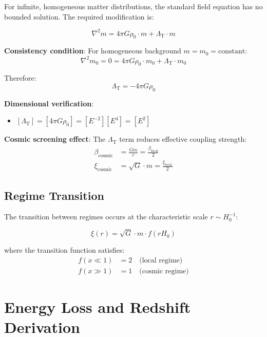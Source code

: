 \documentclass[12pt,a4paper]{article}
\newcommand{\LambdaT}{\Lambda_{\text{T}}}
\begin{document}
	For infinite, homogeneous matter distributions, the standard field equation has no bounded solution. The required modification is:
	
	\begin{equation}
		\boxed{\nabla^2 m = 4\pi G \rho_0 \cdot m + \LambdaT \cdot m}
	\end{equation}
	
	\textbf{Consistency condition}: For homogeneous background $m = m_0 = \text{constant}$:
	\begin{equation}
		\nabla^2 m_0 = 0 = 4\pi G \rho_0 \cdot m_0 + \LambdaT \cdot m_0
	\end{equation}
	
	Therefore:
	\begin{equation}
		\boxed{\LambdaT = -4\pi G \rho_0}
	\end{equation}
	
	\textbf{Dimensional verification}:
	\begin{itemize}
		\item $[\LambdaT] = [4\pi G \rho_0] = [E^{-2}][E^4] = [E^2]$ \checkmark
	\end{itemize}
	
	\textbf{Cosmic screening effect}: The $\LambdaT$ term reduces effective coupling strength:
	\begin{align}
		\beta_{\text{cosmic}} &= \frac{Gm}{r} = \frac{\beta_{\text{local}}}{2} \\
		\xi_{\text{cosmic}} &= \sqrt{G} \cdot m = \frac{\xi_{\text{local}}}{2}
	\end{align}
	
	\subsection{Regime Transition}
	\label{subsec:regime_transition}
	
	The transition between regimes occurs at the characteristic scale $r \sim H_0^{-1}$:
	
	\begin{equation}
		\xi(r) = \sqrt{G} \cdot m \cdot f(r H_0)
	\end{equation}
	
	where the transition function satisfies:
	\begin{align}
		f(x \ll 1) &= 2 \quad \text{(local regime)} \\
		f(x \gg 1) &= 1 \quad \text{(cosmic regime)}
	\end{align}
	
	\section{Energy Loss and Redshift Derivation}
	\label{sec:energy_loss}
	
\end{document}
